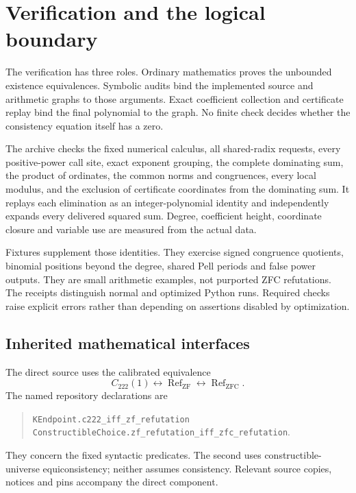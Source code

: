 \documentclass[11pt,letterpaper]{article}
\newcommand{\ZFC}{\mathrm{ZFC}}
\newcommand{\file}[1]{\nolinkurl{#1}}
\begin{document}


\section{Verification and the logical boundary}
\label{sec:verification}

The verification has three roles. Ordinary mathematics
proves the unbounded existence equivalences. Symbolic
audits bind the implemented source and arithmetic
graphs to those arguments. Exact coefficient
collection and certificate replay bind the final
polynomial to the graph. No finite check decides
whether the consistency equation itself has a zero.

The archive checks the fixed numerical calculus,
all shared-radix requests, every positive-power call
site, exact exponent grouping, the complete
dominating sum, the product of ordinates, the common
norms and congruences, every local modulus, and the
exclusion of certificate coordinates from the
dominating sum. It replays each elimination as an
integer-polynomial identity and independently expands
every delivered squared sum. Degree, coefficient
height, coordinate closure and variable use are
measured from the actual data.

Fixtures supplement those identities. They exercise
signed congruence quotients, binomial positions beyond
the degree, shared Pell periods and false power
outputs. They are small arithmetic examples, not
purported ZFC refutations. The receipts distinguish
normal and optimized Python runs. Required checks
raise explicit errors rather than depending on
assertions disabled by optimization.

\subsection{Inherited mathematical interfaces}

The direct source uses the calibrated equivalence
\[
 C_{222}(1)\longleftrightarrow
 \operatorname{Ref}_{\mathrm{ZF}}\longleftrightarrow
 \operatorname{Ref}_{\ZFC}.
\]
The named repository declarations are
\begin{quote}\small
\file{KEndpoint.c222_iff_zf_refutation}\\
\file{ConstructibleChoice.zf_refutation_iff_zfc_refutation}.
\end{quote}
They concern the fixed syntactic predicates. The
second uses constructible-universe equiconsistency;
neither assumes consistency. Relevant source copies,
notices and pins accompany the direct component.
\end{document}

